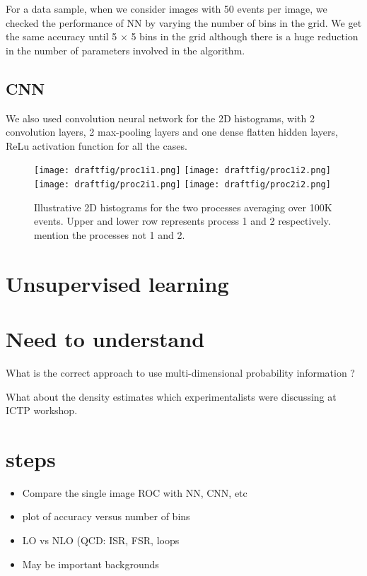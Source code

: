 \documentclass[aps,onecolumn,showpacs,superscriptaddress,groupedaddress,nofootinbib,preprint]{revtex4-1}
\begin{document}
For a data sample, when we consider images with 50 events per image, we checked the performance of NN by varying the number of bins in the grid. We get 
the same accuracy until 5 $\times$ 5 bins in the grid although there is a huge reduction in the number of parameters involved in the algorithm.
\subsection{CNN}
We also used convolution neural network for the 2D histograms, with 2 convolution layers, 2 max-pooling layers and one dense 
flatten hidden layers, ReLu activation function for all the cases.

\begin{figure}
\centering
\texttt{[image: draftfig/proc1i1.png]}
\texttt{[image: draftfig/proc1i2.png]}
\texttt{[image: draftfig/proc2i1.png]}
\texttt{[image: draftfig/proc2i2.png]}
\caption{Illustrative 2D histograms for the two processes averaging over 100K events. Upper and lower row represents process 1 and 2 respectively. mention the processes not 1 and 2.}\label{demopic}
\end{figure}




\section{Unsupervised learning}

\section{Need to understand}
What is the correct approach to use multi-dimensional probability information ?

What about the density estimates which experimentalists were discussing at ICTP workshop.

\section{steps}
\begin{itemize}
\item Compare the single image ROC with NN, CNN, etc
\item plot of accuracy versus number of bins
\item LO vs NLO (QCD: ISR, FSR, loops 
\item May be important backgrounds
\end{itemize}
\end{document}
